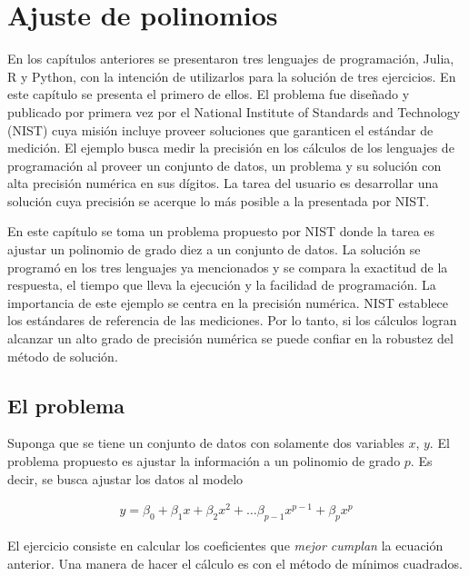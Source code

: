 \chapter{Ajuste de polinomios} \label{cap_polinomios}

En los capítulos anteriores se presentaron tres lenguajes de programación, \textsf{Julia, R } y \textsf{Python}, con la intención de utilizarlos para la solución de tres ejercicios. En este capítulo se presenta el primero de ellos. El problema fue diseñado y publicado por primera vez por el National Institute of Standards and Technology (NIST) cuya misión incluye proveer soluciones que garanticen el estándar de medición. El ejemplo busca medir la precisión en los cálculos de los lenguajes de programación al proveer un conjunto de datos, un problema y su solución con alta precisión numérica en sus dígitos. La tarea del usuario es desarrollar una solución cuya precisión se acerque lo más posible a la presentada por NIST. 

En este capítulo se toma un problema propuesto por NIST donde la tarea es ajustar un polinomio de grado diez a un conjunto de datos. La solución se programó en los tres lenguajes ya mencionados y se compara la exactitud de la respuesta, el tiempo que lleva la ejecución y la facilidad de programación. La importancia de este ejemplo se centra en la precisión numérica. NIST establece los estándares de referencia de las mediciones. Por lo tanto, si los cálculos logran alcanzar un alto grado de precisión numérica se puede confiar en la robustez del método de solución. 


\section{El problema}
Suponga que se tiene un conjunto de datos con solamente dos variables $x$, $y$. El problema propuesto es ajustar la información a un polinomio de grado $p$. Es decir, se busca ajustar los datos al modelo

\begin{equation} \label{eq_matricial_pol}
    \begin{aligned}
    y = \beta_0 + \beta_1 x + \beta_2 x^{2} + \dots \beta_{p-1} x^{p-1} + \beta_p x^{p}
    \end{aligned}
\end{equation}

El ejercicio consiste en calcular los coeficientes que \textit{mejor cumplan} la ecuación anterior. Una manera de hacer el cálculo es con el método de mínimos cuadrados.  

